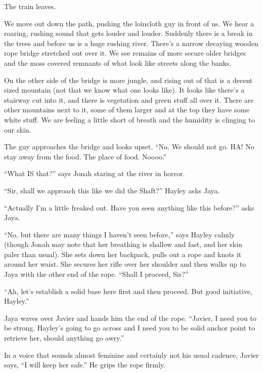 The train leaves.





We move out down the path, pushing the loincloth guy in front of us.  We hear a roaring, rushing sound that gets louder and louder.  Suddenly there is a break in the trees and before us is a huge rushing river.  There's a narrow decaying wooden rope bridge stretched out over it. We see remains of more secure older bridges and the moss covered remnants of what look like streets along the banks.  



On the other side of the bridge is more jungle, and rising out of that is a decent sized mountain (not that we know what one looks like).  It looks like there's a stairway cut into it, and there is vegetation and green stuff all over it.  There are other mountains next to it, some of them larger and at the top they have some white stuff.  We are feeling a little short of breath and the humidity is clinging to our skin.



The guy approaches the bridge and looks upset.  ``No.  We should not go.  HA!  No stay away from the food.  The place of food.  Noooo.''

``What IS that?'' says Jonah staring at the river in horror.

``Sir, shall we approach this like we did the Shaft?'' Hayley asks Jaya.

``Actually I'm a little freaked out.  Have you seen anything like this before?'' asks Jaya.

``No, but there are many things I haven't seen before,'' says Hayley calmly (though Jonah may note that her breathing is shallow and fast, and her skin paler than usual).  She sets down her backpack, pulls out a rope and knots it around her waist.  She secures her rifle over her shoulder and then walks up to Jaya with the other end of the rope.  ``Shall I proceed, Sir?''

``Ah, let's establish a solid base here first and then proceed. But good initiative, Hayley.''

Jaya waves over Javier and hands him the end of the rope.  ``Javier, I need you to be strong.  Hayley's going to go across and I need you to be solid anchor point to retrieve her, should anything go awry.''

In a voice that sounds almost feminine and certainly not his usual cadence, Javier says, ``I will keep her safe.'' He grips the rope firmly.



